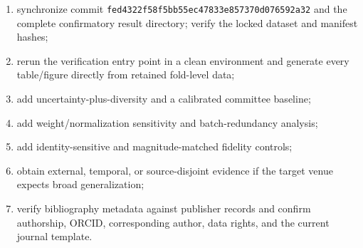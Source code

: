 \begin{enumerate}
    \item synchronize commit
    \texttt{fed4322f58f5bb55ec47833e857370d076592a32} and the complete confirmatory
    result directory; verify the locked dataset and manifest hashes;
    \item rerun the verification entry point in a clean environment and generate
    every table/figure directly from retained fold-level data;
    \item add uncertainty-plus-diversity and a calibrated committee baseline;
    \item add weight/normalization sensitivity and batch-redundancy analysis;
    \item add identity-sensitive and magnitude-matched fidelity controls;
    \item obtain external, temporal, or source-disjoint evidence if the target
    venue expects broad generalization;
    \item verify bibliography metadata against publisher records and confirm
    authorship, ORCID, corresponding author, data rights, and the current journal
    template.
\end{enumerate}
